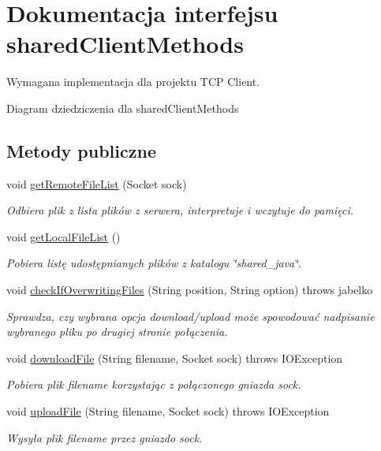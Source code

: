\hypertarget{interfacesharedClientMethods}{\section{Dokumentacja interfejsu shared\+Client\+Methods}
\label{interfacesharedClientMethods}
}


Wymagana implementacja dla projektu T\+C\+P Client.  




Diagram dziedziczenia dla shared\+Client\+Methods
\subsection*{Metody publiczne}
\begin{DoxyCompactItemize}
\item 
void \hyperlink{interfacesharedClientMethods_abe920559f62376c8c89c0fb0a5e014bb}{get\+Remote\+File\+List} (Socket sock)
\begin{DoxyCompactList}\small\item\em Odbiera plik z lista plików z serwera, interpretuje i wczytuje do pamięci. \end{DoxyCompactList}\item 
void \hyperlink{interfacesharedClientMethods_ad4f4e6a9a9103dc4684a72cad791c6db}{get\+Local\+File\+List} ()
\begin{DoxyCompactList}\small\item\em Pobiera listę udostępnianych plików z katalogu {\itshape \char`\"{}shared\+\_\+java\char`\"{}}. \end{DoxyCompactList}\item 
void \hyperlink{interfacesharedClientMethods_a49cf4dd0c572b0cd6bab672f3f50217f}{check\+If\+Overwriting\+Files} (String position, String option)  throws jabelko
\begin{DoxyCompactList}\small\item\em Sprawdza, czy wybrana opcja {\itshape download/upload} może spowodować nadpisanie wybranego pliku po drugiej stronie połączenia. \end{DoxyCompactList}\item 
void \hyperlink{interfacesharedClientMethods_af4a509307d09d62da7143e789e638b27}{download\+File} (String filename, Socket sock)  throws I\+O\+Exception
\begin{DoxyCompactList}\small\item\em Pobiera plik {\itshape filename} korzystając z połączonego gniazda {\itshape sock}. \end{DoxyCompactList}\item 
void \hyperlink{interfacesharedClientMethods_a7c5477fad92bfc52f51afbfdc167615b}{upload\+File} (String filename, Socket sock)  throws I\+O\+Exception
\begin{DoxyCompactList}\small\item\em Wysyła plik {\itshape filename} przez gniazdo sock. \end{DoxyCompactList}\end{DoxyCompactItemize}


